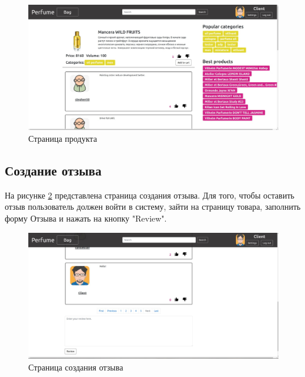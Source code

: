 \captionsetup{singlelinecheck = false, justification=centering}
\begin{figure}[h!]
	\begin{center}
		\includegraphics[scale=0.45]{assets/site_product.jpg}
	\end{center}
	\caption{Страница продукта}
	\label{site_product}
\end{figure}

\subsection{Создание отзыва}

На рисунке \ref{site_create_review} представлена страница создания отзыва. Для того, чтобы оставить отзыв пользователь должен войти в систему, зайти на страницу товара, заполнить форму Отзыва и нажать на кнопку "Review".

\captionsetup{singlelinecheck = false, justification=centering}
\begin{figure}[h!]
	\begin{center}
		\includegraphics[scale=0.45]{assets/site_create_review.jpg}
	\end{center}
	\caption{Страница создания отзыва}
	\label{site_create_review}
\end{figure}

